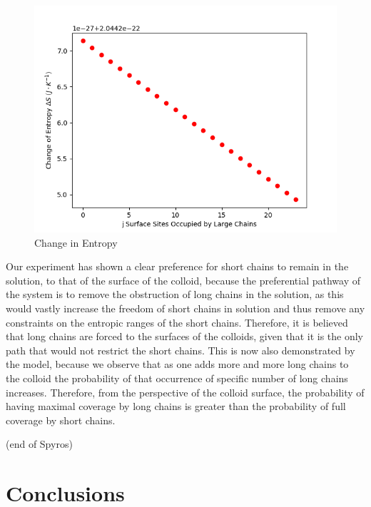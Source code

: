 \documentclass[journal=mamobx,manuscript=article]{achemso}
\begin{document}
\begin{figure}[H]
\includegraphics[scale=0.6]{fig12.png}
\caption{Change in Entropy}
\label{figure 12}
\end{figure}

Our experiment has shown a clear preference for short chains to remain in the solution, to that of the surface of the colloid, because the preferential pathway of the system is to remove the obstruction of long chains in the solution, as this would vastly increase the freedom  of short chains in solution and thus remove any constraints on the entropic ranges of the short chains. Therefore, it is believed that long chains are forced to the surfaces of the colloids, given that it is the only path that would not restrict the short chains. This is now also demonstrated by the model, because we observe that as one adds more and more long chains to the colloid the probability of that occurrence of specific number of long chains increases. Therefore, from the perspective of the colloid surface, the probability of having maximal coverage by long chains is greater than the probability of full coverage by short chains.

(end of Spyros)


\section{Conclusions}


\end{document}
